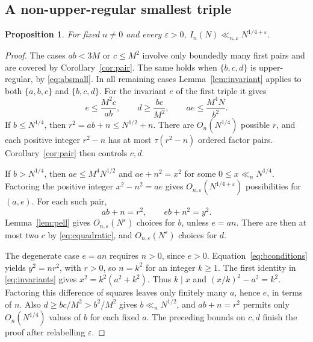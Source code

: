 \documentclass[11pt,a4paper]{article}
\numberwithin{equation}{section}
\newtheorem{proposition}[theorem]{Proposition}
\theoremstyle{remark}
\newcommand{\eps}{\varepsilon}
\begin{document}
\subsection{A non-upper-regular smallest triple}
\begin{proposition}\label{prop:irregular}
For fixed $n\ne0$ and every $\eps>0$, $I_n(N)\ll_{n,\eps}N^{1/4+\eps}$.
\end{proposition}
\begin{proof}
The cases $ab<3M$ or $c\le M^2$ involve only boundedly many first pairs and are covered by Corollary~\ref{cor:pair}. The same holds when $\{b,c,d\}$ is upper-regular, by \eqref{eq:absmall}. In all remaining cases Lemma~\ref{lem:invariant} applies to both $\{a,b,c\}$ and $\{b,c,d\}$. For the invariant $e$ of the first triple it gives
\[
e\le\frac{M^2c}{ab},\qquad d\ge\frac{bc}{M^2},\qquad
 ae\le\frac{M^4N}{b^2}.
\]
If $b\le N^{1/4}$, then $r^2=ab+n\le N^{1/2}+n$. There are $O_n(N^{1/4})$ possible $r$, and each positive integer $r^2-n$ has at most $\tau(r^2-n)$ ordered factor pairs. Corollary~\ref{cor:pair} then controls $c,d$.

If $b>N^{1/4}$, then $ae\le M^4N^{1/2}$ and $ae+n^2=x^2$ for some $0\le x\ll_n N^{1/4}$. Factoring the positive integer $x^2-n^2=ae$ gives $O_{n,\eps}(N^{1/4+\eps})$ possibilities for $(a,e)$. For each such pair,
\begin{equation}\label{eq:bconditions}
ab+n=r^2,\qquad eb+n^2=y^2.
\end{equation}
Lemma~\ref{lem:pell} gives $O_{n,\eps}(N^\eps)$ choices for $b$, unless $e=an$. There are then at most two $c$ by \eqref{eq:cquadratic}, and $O_{n,\eps}(N^\eps)$ choices for $d$.

The degenerate case $e=an$ requires $n>0$, since $e>0$. Equation~\eqref{eq:bconditions} yields $y^2=nr^2$, with $r>0$, so $n=k^2$ for an integer $k\ge1$. The first identity in \eqref{eq:invariants} gives $x^2=k^2(a^2+k^2)$. Thus $k\mid x$ and $(x/k)^2-a^2=k^2$. Factoring this difference of squares leaves only finitely many $a$, hence $e$, in terms of $n$. Also $d\ge bc/M^2>b^2/M^2$ gives $b\ll_n N^{1/2}$, and $ab+n=r^2$ permits only $O_n(N^{1/4})$ values of $b$ for each fixed $a$. The preceding bounds on $c,d$ finish the proof after relabelling $\eps$.
\end{proof}
\end{document}
